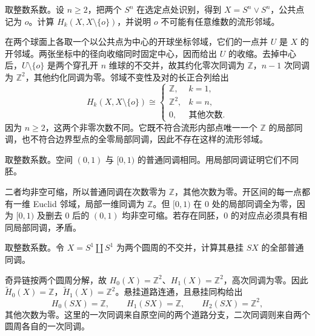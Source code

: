 \begin{exercise}\label{g2:ex:wedge-spheres-local}
	取整数系数。设 \(n\ge2\)，把两个 \(S^n\) 在选定点处识别，得到 \(X=S^n\vee S^n\)，公共点记为 \(o\)。计算 \(H_k(X,X\setminus\{o\})\)，并说明 \(o\) 不可能有任意维数的流形邻域。
\end{exercise}
\begin{solution}
	在两个球面上各取一个以公共点为中心的开球坐标邻域，它们的一点并 \(U\) 是 \(X\) 的开邻域。两张坐标中的径向收缩同时固定中心，因而给出 \(U\) 的收缩。去掉中心后，\(U\setminus\{o\}\) 是两个穿孔开 \(n\) 维球的不交并，故其约化零次同调为 \(\mathbb Z\)，\(n-1\) 次同调为 \(\mathbb Z^2\)，其他约化同调为零。邻域不变性及对的长正合列给出
	\[
		H_k(X,X\setminus\{o\})\cong
		\begin{cases}
			\mathbb Z,&k=1,\\
			\mathbb Z^2,&k=n,\\
			0,&\text{其他次数}.
		\end{cases}
	\]
	因为 \(n\ge2\)，这两个非零次数不同。它既不符合流形内部点唯一一个 \(\mathbb Z\) 的局部同调，也不符合边界型点的全零局部同调，因此不存在这样的流形邻域。
\end{solution}

\begin{exercise}\label{g2:ex:open-half-open-interval}
	取整数系数。空间 \((0,1)\) 与 \([0,1)\) 的普通同调相同。用局部同调证明它们不同胚。
\end{exercise}
\begin{solution}
	二者均非空可缩，所以普通同调在次数零为 \(\mathbb Z\)，其他次数为零。开区间的每一点都有一维 Euclid 邻域，局部一维同调为 \(\mathbb Z\)。但 \([0,1)\) 在 \(0\) 处的局部同调全为零，因为 \([0,1)\) 及删去 \(0\) 后的 \((0,1)\) 均非空可缩。若存在同胚，\(0\) 的对应点必须具有相同局部同调，矛盾。
\end{solution}

\begin{exercise}\label{g2:ex:suspension-disjoint-circles}
	取整数系数。令 \(X=S^1\amalg S^1\) 为两个圆周的不交并，计算其悬挂 \(SX\) 的全部普通同调。
\end{exercise}
\begin{solution}
	奇异链按两个圆周分解，故 \(H_0(X)=\mathbb Z^2\)、\(H_1(X)=\mathbb Z^2\)，高次同调为零。因此 \(\widetilde H_0(X)=\mathbb Z\)，\(\widetilde H_1(X)=\mathbb Z^2\)。悬挂道路连通，且悬挂同构给出
	\[
		H_0(SX)=\mathbb Z,\qquad H_1(SX)=\mathbb Z,\qquad
		H_2(SX)=\mathbb Z^2,
	\]
	其他次数为零。这里的一次同调来自原空间的两个道路分支，二次同调则来自两个圆周各自的一次同调。
\end{solution}

